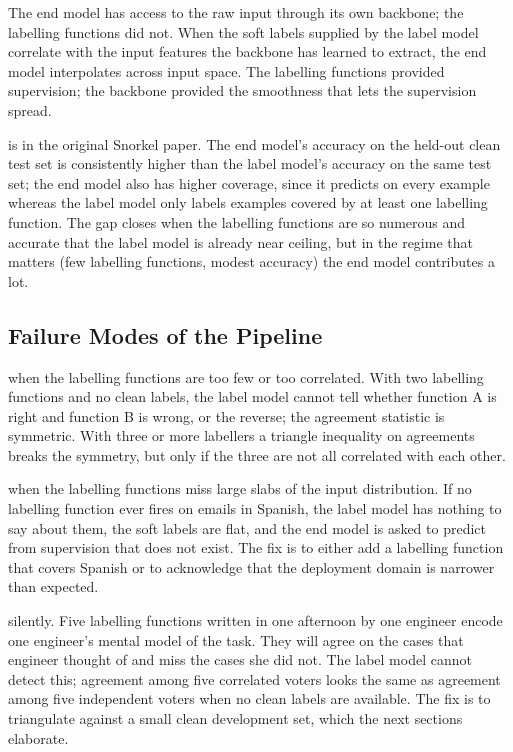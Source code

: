  The end model has access to the raw input through its own backbone; the labelling functions did not. When the soft labels supplied by the label model correlate with the input features the backbone has learned to extract, the end model interpolates across input space. The labelling functions provided supervision; the backbone provided the smoothness that lets the supervision spread.

 is in the original Snorkel paper. The end model's accuracy on the held-out clean test set is consistently higher than the label model's accuracy on the same test set; the end model also has higher coverage, since it predicts on every example whereas the label model only labels examples covered by at least one labelling function. The gap closes when the labelling functions are so numerous and accurate that the label model is already near ceiling, but in the regime that matters (few labelling functions, modest accuracy) the end model contributes a lot.

\subsection{Failure Modes of the Pipeline}


 when the labelling functions are too few or too correlated. With two labelling functions and no clean labels, the label model cannot tell whether function A is right and function B is wrong, or the reverse; the agreement statistic is symmetric. With three or more labellers a triangle inequality on agreements breaks the symmetry, but only if the three are not all correlated with each other.

 when the labelling functions miss large slabs of the input distribution. If no labelling function ever fires on emails in Spanish, the label model has nothing to say about them, the soft labels are flat, and the end model is asked to predict from supervision that does not exist. The fix is to either add a labelling function that covers Spanish or to acknowledge that the deployment domain is narrower than expected.

 silently. Five labelling functions written in one afternoon by one engineer encode one engineer's mental model of the task. They will agree on the cases that engineer thought of and miss the cases she did not. The label model cannot detect this; agreement among five correlated voters looks the same as agreement among five independent voters when no clean labels are available. The fix is to triangulate against a small clean development set, which the next sections elaborate.

